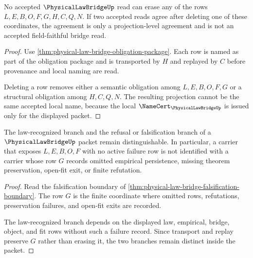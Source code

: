 \begin{theorem}
\label{thm:physical-law-bridge-field-faithful-obligation}
No accepted $\PhysicalLawBridgeUp$ read can erase any of the rows $L,E,B,O,F,G,H,C,Q,N$. If two accepted reads agree after deleting one of these coordinates, the agreement is only a projection-level agreement and is not an accepted field-faithful bridge read.
\end{theorem}
\begin{proof}
Use \autoref{thm:physical-law-bridge-obligation-package}. Each row is named as part of the obligation package and is transported by $H$ and replayed by $C$ before provenance and local naming are read.

Deleting a row removes either a semantic obligation among $L,E,B,O,F,G$ or a structural obligation among $H,C,Q,N$. The resulting projection cannot be the same accepted local name, because the local $\NameCert_{\PhysicalLawBridgeUp}$ is issued only for the displayed packet.
\end{proof}

\begin{theorem}
\label{thm:physical-law-bridge-nontrivial-obligation}
The law-recognized branch and the refusal or falsification branch of a $\PhysicalLawBridgeUp$ packet remain distinguishable. In particular, a carrier that exposes $L,E,B,O,F$ with no active failure row is not identified with a carrier whose row $G$ records omitted empirical persistence, missing theorem preservation, open-fit exit, or finite refutation.
\end{theorem}
\begin{proof}
Read the falsification boundary of \autoref{thm:physical-law-bridge-falsification-boundary}. The row $G$ is the finite coordinate where omitted rows, refutations, preservation failures, and open-fit exits are recorded.

The law-recognized branch depends on the displayed law, empirical, bridge, object, and fit rows without such a failure record. Since transport and replay preserve $G$ rather than erasing it, the two branches remain distinct inside the packet.
\end{proof}



